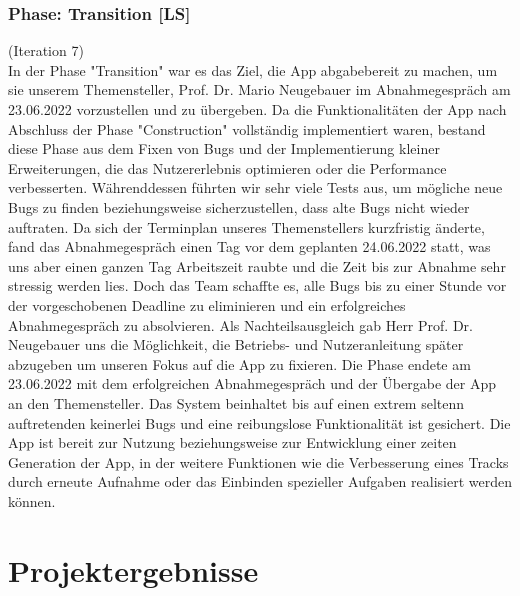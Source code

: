 \documentclass[10pt]{article}
\begin{document}
\subsubsection{Phase: Transition [LS]}
(Iteration 7) \\
In der Phase "Transition" war es das Ziel, die App abgabebereit zu machen, um sie unserem Themensteller, Prof. Dr. Mario Neugebauer im Abnahmegespräch am 23.06.2022 vorzustellen
und zu übergeben. Da die Funktionalitäten der App nach Abschluss der Phase "Construction" vollständig implementiert waren, bestand diese Phase aus dem Fixen von Bugs und der 
Implementierung kleiner Erweiterungen, die das Nutzererlebnis optimieren oder die Performance verbesserten. Währenddessen führten wir sehr viele Tests aus, um mögliche neue Bugs
zu finden beziehungsweise sicherzustellen, dass alte Bugs nicht wieder auftraten. Da sich der Terminplan unseres Themenstellers kurzfristig änderte, fand das Abnahmegespräch einen
Tag vor dem geplanten 24.06.2022 statt, was uns aber einen ganzen Tag Arbeitszeit raubte und die Zeit bis zur Abnahme sehr stressig werden lies. Doch das Team schaffte es,
alle Bugs bis zu einer Stunde vor der vorgeschobenen Deadline zu eliminieren und ein erfolgreiches Abnahmegespräch zu absolvieren. Als Nachteilsausgleich gab
Herr Prof. Dr. Neugebauer uns die Möglichkeit, die Betriebs- und Nutzeranleitung später abzugeben um unseren Fokus auf die App zu fixieren.
Die Phase endete am 23.06.2022 mit dem erfolgreichen Abnahmegespräch und der Übergabe der App an den Themensteller. Das System beinhaltet bis auf einen extrem seltenn auftretenden
keinerlei Bugs und eine reibungslose Funktionalität ist gesichert. Die App ist bereit zur Nutzung beziehungsweise zur Entwicklung einer zeiten Generation der App, in der weitere
Funktionen wie die Verbesserung eines Tracks durch erneute Aufnahme oder das Einbinden spezieller Aufgaben realisiert werden können.

\section{Projektergebnisse}
\end{document}
